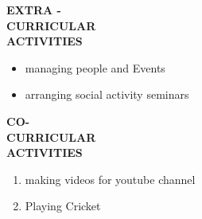 \documentclass{article}
\begin{document}
 	\begin{flushleft} 
 		
 		
 		
 		\vspace{0.4in}
 		\textbf{EXTRA - \\CURRICULAR \\ACTIVITIES }
 		\begin{itemize}
 			\vspace{-0.65in}
 			\addtolength{\itemindent}{1.359in}
 			\item  managing people and Events
 			\item  arranging social activity seminars
 			
 		\end{itemize}
 	\end{flushleft}

 \begin{flushleft} 
 	\vspace{0.4in}
 	\textbf{CO- \\CURRICULAR \\ACTIVITIES }
 	\begin{enumerate}
 		\vspace{-0.65in}
 		\addtolength{\itemindent}{1.359in}
 		\item  making videos for youtube channel 
 		\item  Playing Cricket
 		
 	\end{enumerate}
 \end{flushleft}
\end{document}
